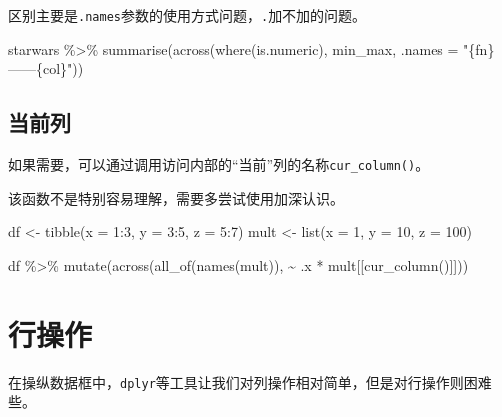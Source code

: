 \documentclass[
]{book}
\newenvironment{Shaded}{\begin{snugshade}}{\end{snugshade}}
\newcommand{\AttributeTok}[1]{\textcolor[rgb]{0.77,0.63,0.00}{#1}}
\newcommand{\DecValTok}[1]{\textcolor[rgb]{0.00,0.00,0.81}{#1}}
\newcommand{\FunctionTok}[1]{\textcolor[rgb]{0.00,0.00,0.00}{#1}}
\newcommand{\NormalTok}[1]{#1}
\newcommand{\OtherTok}[1]{\textcolor[rgb]{0.56,0.35,0.01}{#1}}
\newcommand{\SpecialCharTok}[1]{\textcolor[rgb]{0.00,0.00,0.00}{#1}}
\newcommand{\StringTok}[1]{\textcolor[rgb]{0.31,0.60,0.02}{#1}}
\begin{document}
区别主要是\texttt{.names}参数的使用方式问题，\texttt{.}加不加的问题。

\begin{Shaded}
\begin{Highlighting}[]

\NormalTok{starwars }\SpecialCharTok{\%\textgreater{}\%} \FunctionTok{summarise}\NormalTok{(}\FunctionTok{across}\NormalTok{(}\FunctionTok{where}\NormalTok{(is.numeric), min\_max, }\AttributeTok{.names =} \StringTok{"\{fn\}——\{col\}"}\NormalTok{))}
\end{Highlighting}
\end{Shaded}

\hypertarget{ux5f53ux524dux5217}{%
\subsection{当前列}\label{ux5f53ux524dux5217}}

如果需要，可以通过调用访问内部的``当前''列的名称\texttt{cur\_column()}。

该函数不是特别容易理解，需要多尝试使用加深认识。

\begin{Shaded}
\begin{Highlighting}[]
\NormalTok{df }\OtherTok{\textless{}{-}} \FunctionTok{tibble}\NormalTok{(}\AttributeTok{x =} \DecValTok{1}\SpecialCharTok{:}\DecValTok{3}\NormalTok{, }\AttributeTok{y =} \DecValTok{3}\SpecialCharTok{:}\DecValTok{5}\NormalTok{, }\AttributeTok{z =} \DecValTok{5}\SpecialCharTok{:}\DecValTok{7}\NormalTok{)}
\NormalTok{mult }\OtherTok{\textless{}{-}} \FunctionTok{list}\NormalTok{(}\AttributeTok{x =} \DecValTok{1}\NormalTok{, }\AttributeTok{y =} \DecValTok{10}\NormalTok{, }\AttributeTok{z =} \DecValTok{100}\NormalTok{)}

\NormalTok{df }\SpecialCharTok{\%\textgreater{}\%} \FunctionTok{mutate}\NormalTok{(}\FunctionTok{across}\NormalTok{(}\FunctionTok{all\_of}\NormalTok{(}\FunctionTok{names}\NormalTok{(mult)), }\SpecialCharTok{\textasciitilde{}}\NormalTok{ .x }\SpecialCharTok{*}\NormalTok{ mult[[}\FunctionTok{cur\_column}\NormalTok{()]]))}
\end{Highlighting}
\end{Shaded}

\hypertarget{ux884cux64cdux4f5c}{%
\section{行操作}\label{ux884cux64cdux4f5c}}

在操纵数据框中，\texttt{dplyr}等工具让我们对列操作相对简单，但是对行操作则困难些。
\end{document}
